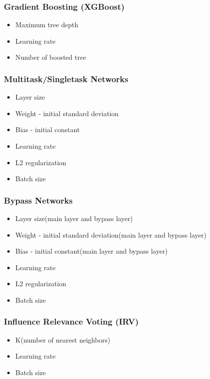 \subsubsection{Gradient Boosting (XGBoost)}
\begin{itemize}
    \item Maximum tree depth
    \item Learning rate
    \item Number of boosted tree
\end{itemize}

\subsubsection{Multitask/Singletask Networks}
\begin{itemize}
    \item Layer size
    \item Weight - initial standard deviation
    \item Bias - initial constant
    \item Learning rate
    \item L2 regularization
    \item Batch size
\end{itemize}

\subsubsection{Bypass Networks}
\begin{itemize}
    \item Layer size(main layer and bypass layer)
    \item Weight - initial standard deviation(main layer and bypass layer)
    \item Bias - initial constant(main layer and bypass layer)
    \item Learning rate
    \item L2 regularization
    \item Batch size
\end{itemize}

\subsubsection{Influence Relevance Voting (IRV)}
\begin{itemize}
    \item K(number of nearest neighbors)
    \item Learning rate
    \item Batch size
\end{itemize}

